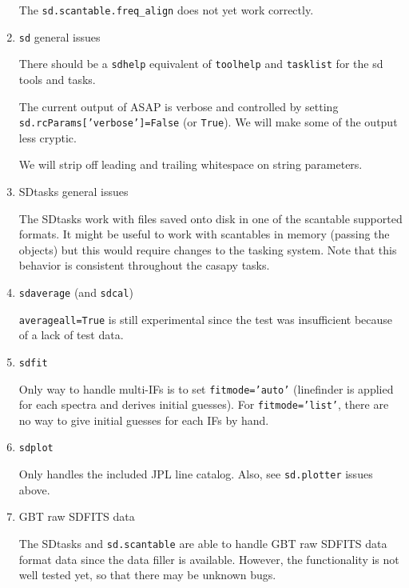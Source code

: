 \begin{enumerate}
  The {\tt sd.scantable.freq\_align} does not yet work correctly.


\item {\tt sd} general issues

  There should be a {\tt sdhelp} equivalent of {\tt toolhelp}
  and {\tt tasklist} for the sd tools and tasks.

  The current output of ASAP is verbose and controlled by
  setting {\tt sd.rcParams['verbose']=False} (or {\tt True}).
  We will make some of the output less cryptic.

  We will strip off leading and trailing whitespace on string parameters.

\item SDtasks general issues

  The SDtasks work with files saved onto disk in one of the 
  scantable supported formats.  It might be useful to
  work with scantables in memory (passing the objects) but this
  would require changes to the tasking system.  Note that this
  behavior is consistent throughout the casapy tasks.


\item {\tt sdaverage} (and {\tt sdcal})

  {\tt averageall=True} is still experimental since the test was insufficient 
  because of a lack of test data.

% 

\item {\tt sdfit}

%
Only way to handle multi-IFs is to set {\tt fitmode='auto'}
(linefinder is applied for each spectra and derives initial guesses).
For {\tt fitmode='list'}, there are no way to give initial guesses for each IFs by hand.

\item {\tt sdplot}

  Only handles the included JPL line catalog.  Also, see {\tt sd.plotter} issues above.

\item GBT raw SDFITS data

  The SDtasks and {\tt sd.scantable} are able to handle GBT raw SDFITS data format data 
  since the data filler is available. However, the functionality is not well 
  tested yet, so that there may be unknown bugs.  

%

\end{enumerate}

